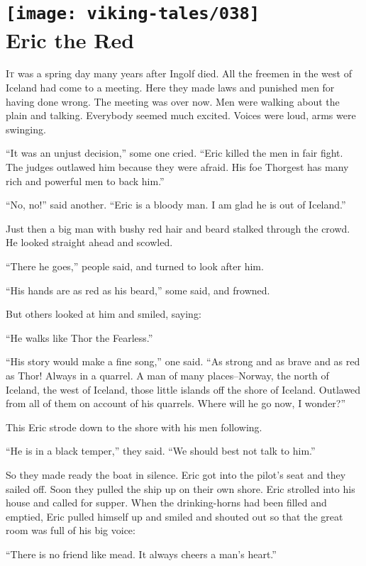 \chapter[Eric the Red]{
    \texttt{[image: viking-tales/038]}\\
    Eric the Red}

\lettrine{I}{t} was a spring day many years after Ingolf died. All the
freemen in the west of Iceland had come to a meeting. Here they made laws
and punished men for having done wrong. The meeting was over now. Men
were walking about the plain and talking. Everybody seemed much excited.
Voices were loud, arms were swinging.

``It was an unjust decision,'' some one cried. ``Eric killed the men in
fair fight. The judges outlawed him because they were afraid. His foe
Thorgest has many rich and powerful men to back him.''

``No, no!'' said another. ``Eric is a bloody man. I am glad he is out of
Iceland.''

Just then a big man with bushy red hair and beard stalked through the
crowd. He looked straight ahead and scowled.

``There he goes,'' people said, and turned to look after him.

``His hands are as red as his beard,'' some said, and frowned.

But others looked at him and smiled, saying:

``He walks like Thor the Fearless.''

``His story would make a fine song,'' one said. ``As strong and as brave
and as red as Thor! Always in a quarrel. A man of many places--Norway,
the north of Iceland, the west of Iceland, those little islands off the
shore of Iceland. Outlawed from all of them on account of his quarrels.
Where will he go now, I wonder?''

This Eric strode down to the shore with his men following.

``He is in a black temper,'' they said. ``We should best not talk to
him.''

So they made ready the boat in silence. Eric got into the pilot's seat
and they sailed off. Soon they pulled the ship up on their own shore.
Eric strolled into his house and called for supper. When the
drinking-horns had been filled and emptied, Eric pulled himself up and
smiled and shouted out so that the great room was full of his big voice:

``There is no friend like mead. It always cheers a man's heart.''

